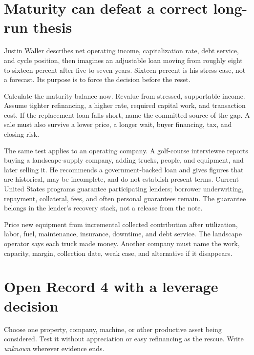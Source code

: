 \section{Maturity can defeat a correct long-run thesis}

Justin Waller describes net operating income, capitalization rate, debt service,
and cycle position, then imagines an adjustable loan moving from roughly eight
to sixteen percent after five to seven years. Sixteen percent is his stress
case, not a forecast. Its purpose is to force the decision before the reset.

Calculate the maturity balance now. Revalue from stressed, supportable income.
Assume tighter refinancing, a higher rate, required capital work, and transaction
cost. If the replacement loan falls short, name the committed source of the
gap. A sale must also survive a lower price, a longer wait, buyer financing,
tax, and closing risk.

The same test applies to an operating company. A golf-course interviewee
reports buying a landscape-supply company, adding trucks, people, and equipment,
and later selling it. He recommends a government-backed loan and gives figures
that are historical, may be incomplete, and do not establish present terms.
Current United States programs guarantee participating lenders; borrower
underwriting, repayment, collateral, fees, and often personal guarantees remain.
The guarantee belongs in the lender's recovery stack, not a release from the
note.

Price new equipment from incremental collected contribution after utilization,
labor, fuel, maintenance, insurance, downtime, and debt service. The landscape
operator says each truck made money. Another company must name the work,
capacity, margin, collection date, weak case, and alternative if it disappears.

\section{Open Record 4 with a leverage decision}
\enlargethispage{3\baselineskip}

Choose one property, company, machine, or other productive asset being
considered. Test it without appreciation or easy refinancing as the rescue.
Write \emph{unknown} wherever evidence ends.


